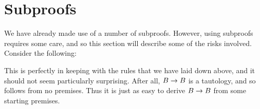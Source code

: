 

\section{Subproofs}

We have already made use of a number of subproofs.
However, using subproofs requires some care, and so this section will describe some of the risks involved.
Consider the following:
\begin{fitchproof}
	 \pr{}
	\open
		 
		 
	\close
\end{fitchproof}
This is perfectly in keeping with the rules that we have laid down above, and it should not seem particularly surprising.
After all, $B \rightarrow B$ is a tautology, and so follows from no premises.
Thus it is just as easy to derive $B \rightarrow B$ from some starting premises.

